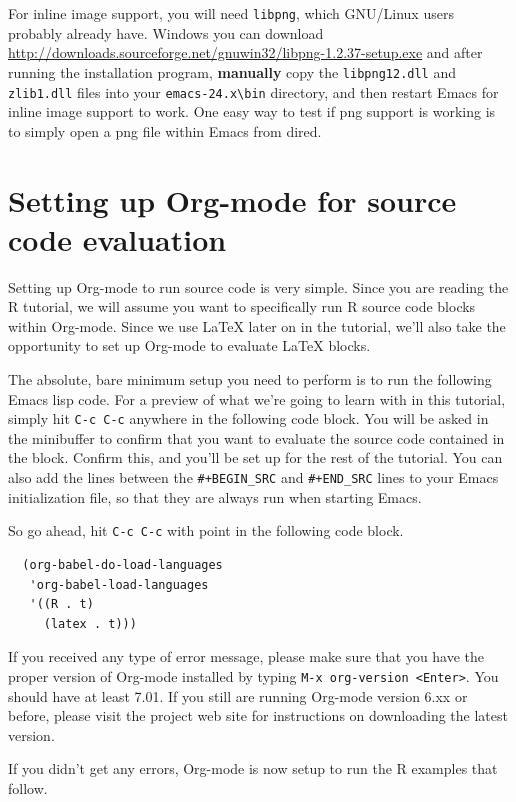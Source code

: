 \documentclass[11pt]{article}
\begin{document}
For inline image support, you will need \texttt{libpng}, which GNU/Linux users probably already have.  Windows you can download \url{http://downloads.sourceforge.net/gnuwin32/libpng-1.2.37-setup.exe} and after running the installation program, \textbf{manually} copy the \texttt{libpng12.dll} and \texttt{zlib1.dll} files into your \texttt{emacs-24.x\textbackslash{}bin} directory, and then restart Emacs for inline image support to work. One easy way to test if png support is working is to simply open a png file within Emacs from dired.
\section*{Setting up Org-mode for source code evaluation}
\label{sec-2}

Setting up Org-mode to run source code is very simple. Since you are reading the R tutorial, we will assume you want to specifically run R source code blocks within Org-mode. Since we use \LaTeX{} later on in the tutorial, we'll also take the opportunity to set up Org-mode to evaluate \LaTeX{} blocks. 

The absolute, bare minimum setup you need to perform is to run the following Emacs lisp code. For a preview of what we're going to learn with in this tutorial, simply hit \texttt{C-c C-c} anywhere in the following code block. You will be asked in the minibuffer to confirm that you want to evaluate the source code contained in the block. Confirm this, and you'll be set up for the rest of the tutorial. You can also add the lines between the \texttt{\#+BEGIN\_SRC} and \texttt{\#+END\_SRC} lines to your Emacs initialization file, so that they are always run when starting Emacs.

So go ahead, hit \texttt{C-c C-c} with point in the following code block. 

\begin{verbatim}
  (org-babel-do-load-languages
   'org-babel-load-languages
   '((R . t)
     (latex . t)))
\end{verbatim}

If you received any type of error message, please make sure that you have the proper version of Org-mode installed by typing \texttt{M-x org-version <Enter>}. You should have at least 7.01. If you still are running Org-mode version 6.xx or before, please visit the project web site for instructions on downloading the latest version.

If you didn't get any errors, Org-mode is now setup to run the R examples that follow.
\end{document}

